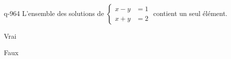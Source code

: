 \begin{truefalse}{q-964}
L'ensemble des solutions de $\begin{cases}x-y &= 1 \\ x+y &= 2\end{cases}$ contient un seul élément.
\item* Vrai
\item Faux
\end{truefalse}

